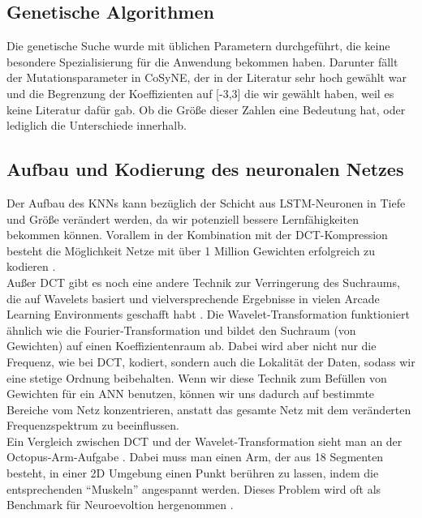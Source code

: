         \subsection*{Genetische Algorithmen}
            Die genetische Suche wurde mit üblichen Parametern durchgeführt, die keine besondere Spezialisierung für die Anwendung bekommen haben. Darunter fällt der Mutationsparameter in CoSyNE, der in der Literatur sehr hoch gewählt war \cite{cosyne2} und die Begrenzung der Koeffizienten auf [-3,3] die wir gewählt haben, weil es keine Literatur dafür gab. Ob die Größe dieser Zahlen eine Bedeutung hat, oder lediglich die Unterschiede innerhalb.

        \subsection*{Aufbau und Kodierung des neuronalen Netzes}
            Der Aufbau des KNNs kann bezüglich der Schicht aus LSTM-Neuronen in Tiefe und Größe verändert werden, da wir potenziell bessere Lernfähigkeiten bekommen können. Vorallem in der Kombination mit der DCT-Kompression besteht die Möglichkeit Netze mit über 1 Million Gewichten erfolgreich zu kodieren \cite{cosyne4}. \\

            \noindent
            Außer DCT gibt es noch eine andere Technik zur Verringerung des Suchraums, die auf Wavelets basiert und vielversprechende Ergebnisse in vielen Arcade Learning Environments geschafft habt \cite{wavelet}. Die Wavelet-Transformation funktioniert ähnlich wie die Fourier-Transformation und bildet den Suchraum (von Gewichten) auf einen Koeffizientenraum ab. Dabei wird aber nicht nur die Frequenz, wie bei DCT, kodiert, sondern auch die Lokalität der Daten, sodass wir eine stetige Ordnung beibehalten. Wenn wir diese Technik zum Befüllen von Gewichten für ein ANN benutzen, können wir uns dadurch auf bestimmte Bereiche vom Netz konzentrieren, anstatt das gesamte Netz mit dem veränderten Frequenzspektrum zu beeinflussen. \\

            \noindent
            Ein Vergleich zwischen DCT und der Wavelet-Transformation sieht man an der Octopus-Arm-Aufgabe \cite{wavelet}. Dabei muss man einen Arm, der aus 18 Segmenten besteht, in einer 2D Umgebung einen Punkt berühren zu lassen, indem die entsprechenden ``Muskeln'' angespannt werden. Dieses Problem wird oft als Benchmark für Neuroevoltion hergenommen \cite{cosyne1}\cite{cosyne4}\cite{wavelet}.

